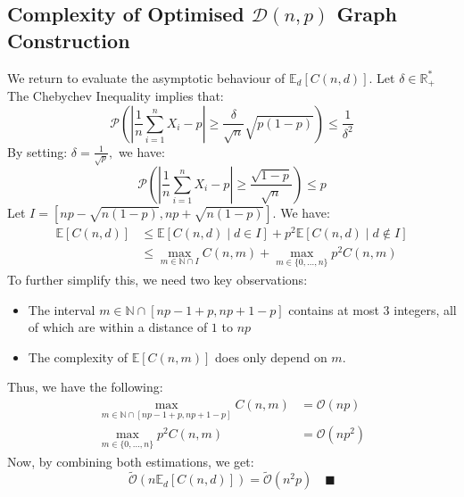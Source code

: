 \subsection{Complexity of Optimised $\mathcal{D}(n,p)$ Graph Construction}
We return to evaluate the asymptotic behaviour of $\mathbb{E}_d[C(n,d)].$
\newline Let $\delta \in \mathbb{R}_+^*$
\newline The Chebychev Inequality implies that:
$$
\mathscr{P}\left(\left \lvert \frac{1}{n}\sum_{i=1}^nX_i -p \right \rvert \ge \frac{\delta}{\sqrt{n}}\sqrt{p(1-p)}  \right) \le \frac{1}{\delta^2}
$$
By setting: $\delta=\frac{1}{\sqrt{p}},$ we have:
$$\mathscr{P}\left(\left \lvert \frac{1}{n}\sum_{i=1}^nX_i -p \right \rvert \ge \frac{\sqrt{1-p}}{\sqrt{n}}  \right) \le p 
$$
Let $I=[np-\sqrt{n(1-p)},np+\sqrt{n(1-p)}].$
\newline 
We have:
\begin{align*}
\mathbb{E}\left[C(n,d)\right]  &\le \mathbb{E}\left[C(n,d) \mid d\in I\right] + p^2\mathbb{E}\left[C(n,d) \mid d\notin I\right] \\
&\le \max_{m\in \mathbb{N} \cap I}C(n,m) + \max_{m\in\{0,\dots,n\}}p^2C(n,m) 
 \end{align*}
To further simplify this, we need two key observations:
\begin{itemize}
	\item The interval $m\in \mathbb{N} \cap [np-1+p,np+1-p]$ contains at most $3$ integers, all of which are within a distance of $1$ to $np$
	\item The complexity of $\mathbb{E}[C(n,m)]$ does only depend on $m.$
\end{itemize}
Thus, we have the following:
\begin{align*}
	\max_{m\in \mathbb{N} \cap [np-1+p,np+1-p]}C(n,m) &= \mathcal{O}(np) \\
	\max_{m\in\{0,\dots,n\}}p^2C(n,m) &= \mathcal{O}(np^2)
\end{align*}
Now, by combining both estimations, we get:
$$
\tilde{\mathcal{O}}(n\mathbb{E}_d[C(n,d)])=\tilde{\mathcal{O}}(n^2p) \quad \blacksquare
$$

